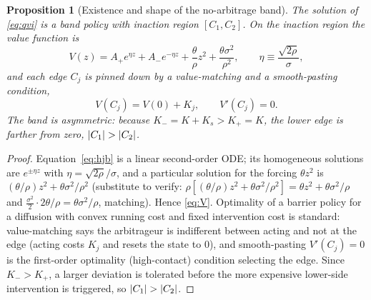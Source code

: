 \documentclass[11pt,a4paper]{article}
\DeclarePairedDelimiter{\abs}{\lvert}{\rvert}
\theoremstyle{plain}
\newtheorem{proposition}{Proposition}
\theoremstyle{definition}
\theoremstyle{remark}
\begin{document}
\begin{proposition}[Existence and shape of the no-arbitrage band]\label{prop:band}
The solution of \eqref{eq:qvi} is a band policy with inaction region $[C_1,C_2]$. On the inaction region the value function is
\begin{equation}
V(z) = A_{+}e^{\eta z} + A_{-}e^{-\eta z} + \frac{\theta}{\rho}z^2 + \frac{\theta\sigma^2}{\rho^2}, \qquad \eta \equiv \frac{\sqrt{2\rho}}{\sigma}, \label{eq:V}
\end{equation}
and each edge $C_j$ is pinned down by a \emph{value-matching} and a \emph{smooth-pasting} condition,
\begin{equation}
V(C_j) = V(0) + K_j, \qquad V'(C_j) = 0. \label{eq:smoothpaste}
\end{equation}
The band is asymmetric: because $K_{-}=K+K_s>K_{+}=K$, the lower edge is farther from zero, $\abs{C_1}>\abs{C_2}$.
\end{proposition}
\begin{proof}
Equation~\eqref{eq:hjb} is a linear second-order ODE; its homogeneous solutions are $e^{\pm\eta z}$ with $\eta=\sqrt{2\rho}/\sigma$, and a particular solution for the forcing $\theta z^2$ is $(\theta/\rho)z^2+\theta\sigma^2/\rho^2$ (substitute to verify: $\rho[(\theta/\rho)z^2+\theta\sigma^2/\rho^2] = \theta z^2+\theta\sigma^2/\rho$ and $\tfrac{\sigma^2}{2}\cdot 2\theta/\rho=\theta\sigma^2/\rho$, matching). Hence \eqref{eq:V}. Optimality of a barrier policy for a diffusion with convex running cost and fixed intervention cost is standard: value-matching says the arbitrageur is indifferent between acting and not at the edge (acting costs $K_j$ and resets the state to $0$), and smooth-pasting $V'(C_j)=0$ is the first-order optimality (high-contact) condition selecting the edge. Since $K_{-}>K_{+}$, a larger deviation is tolerated before the more expensive lower-side intervention is triggered, so $\abs{C_1}>\abs{C_2}$.
\end{proof}
\end{document}

